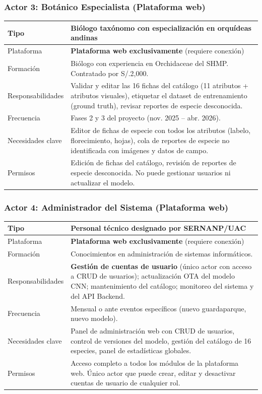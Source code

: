 \documentclass[12pt, a4paper]{article}
\begin{document}
\subsubsection{Actor 3: Bot\'anico Especialista (Plataforma web)}
\begin{longtable}{|p{3.5cm}|p{11cm}|}
\hline
Tipo & Bi\'ologo tax\'onomo con especializaci\'on en orqu\'ideas andinas \\
\hline
Plataforma & \textbf{Plataforma web exclusivamente} (requiere conexi\'on) \\
\hline
Formaci\'on & Bi\'ologo con experiencia en Orchidaceae del SHMP. Contratado por S/.2,000. \\
\hline
Responsabilidades & Validar y editar las 16 fichas del cat\'alogo (11 atributos + atributos visuales), etiquetar el dataset de entrenamiento (ground truth), revisar reportes de especie desconocida. \\
\hline
Frecuencia & Fases 2 y 3 del proyecto (nov. 2025 -- abr. 2026). \\
\hline
Necesidades clave & Editor de fichas de especie con todos los atributos (labelo, florecimiento, hojas), cola de reportes de especie no identificada con im\'agenes y datos de campo. \\
\hline
Permisos & Edici\'on de fichas del cat\'alogo, revisi\'on de reportes de especie desconocida. No puede gestionar usuarios ni actualizar el modelo. \\
\hline
\end{longtable}

\subsubsection{Actor 4: Administrador del Sistema (Plataforma web)}
\begin{longtable}{|p{3.5cm}|p{11cm}|}
\hline
Tipo & Personal t\'ecnico designado por SERNANP/UAC \\
\hline
Plataforma & \textbf{Plataforma web exclusivamente} (requiere conexi\'on) \\
\hline
Formaci\'on & Conocimientos en administraci\'on de sistemas inform\'aticos. \\
\hline
Responsabilidades & \textbf{Gesti\'on de cuentas de usuario} (\'unico actor con acceso a CRUD de usuarios); actualizaci\'on OTA del modelo CNN; mantenimiento del cat\'alogo; monitoreo del sistema y del API Backend. \\
\hline
Frecuencia & Mensual o ante eventos espec\'ificos (nuevo guardaparque, nuevo modelo). \\
\hline
Necesidades clave & Panel de administraci\'on web con CRUD de usuarios, control de versiones del modelo, gesti\'on del cat\'alogo de 16 especies, panel de estad\'isticas globales. \\
\hline
Permisos & Acceso completo a todos los m\'odulos de la plataforma web. \'Unico actor que puede crear, editar y desactivar cuentas de usuario de cualquier rol. \\
\hline
\end{longtable}
\end{document}
